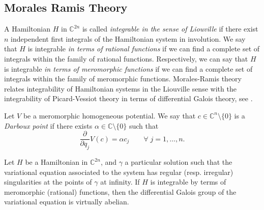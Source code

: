 \documentclass[final]{siamart0516}
\begin{document}
\subsection{Morales Ramis Theory}
A Hamiltonian $H$ in $\mathbb{C}^{2n}$ is called \emph{integrable in the sense of Liouville} if
there exist $n$ independent first integrals of the Hamiltonian system in involution. We 
say that $H$ is integrable \emph{in terms of rational functions} if we can
find a complete set of integrals within the family of rational functions.
Respectively, we can say that $H$ is integrable \emph{in terms of
    meromorphic functions} if we can find a complete set of integrals within the
family of meromorphic functions.
Morales-Ramis theory relates integrability of Hamiltonian systems in the Liouville sense with the integrability of Picard-Vessiot theory in terms of differential Galois theory, see \cite{morales, morasurvey, mora1, mora2}.

Let $V$ be a meromorphic homogeneous potential.
We say that 
$c\in \mathbb{C}^n\setminus\{0\}$ is a {\em Darboux point} if there exists $\alpha\in \mathbb{C}\setminus\{0\}$
such that
$$
\frac{\partial}{\partial q_j} V(c) = \alpha c_j   \qquad \forall \; j=1,\dots , n. 
$$

\begin{theorem}\label{mora}
    \label{:MR} Let $H$ be a Hamiltonian in $\mathbb{C}^{2n}$, and $\gamma$ a
    particular solution such that the variational  equation associated to the system has regular (resp. irregular)
    singularities at the points of $\gamma$ at infinity. If $H$ is
    integrable by terms of meromorphic (rational) functions,
    then the differential Galois group of the variational equation is virtually abelian.
\end{theorem}
\end{document}
